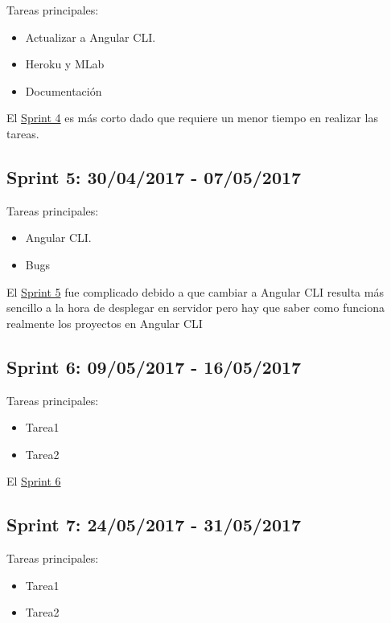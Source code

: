 Tareas principales:

\begin{itemize}
	\item Actualizar a Angular CLI.
	\item Heroku y MLab
	\item Documentación
\end{itemize}


El \underline{Sprint 4} es más corto dado que requiere un menor tiempo en realizar las tareas.

\subsection{Sprint 5: 30/04/2017 - 07/05/2017}\label{sprint5}

Tareas principales:

\begin{itemize}
	\item Angular CLI.
	\item Bugs
\end{itemize}


El \underline{Sprint 5} fue complicado debido a que cambiar a Angular CLI resulta más sencillo a la hora de desplegar en servidor pero hay que saber como funciona realmente los proyectos en Angular CLI

\subsection{Sprint 6: 09/05/2017 - 16/05/2017}\label{sprint6}

Tareas principales:

\begin{itemize}
	\item Tarea1
	\item Tarea2
\end{itemize}


El \underline{Sprint 6} 

\subsection{Sprint 7: 24/05/2017 - 31/05/2017}\label{sprint7}

Tareas principales:

\begin{itemize}
	\item Tarea1
	\item Tarea2
\end{itemize}

